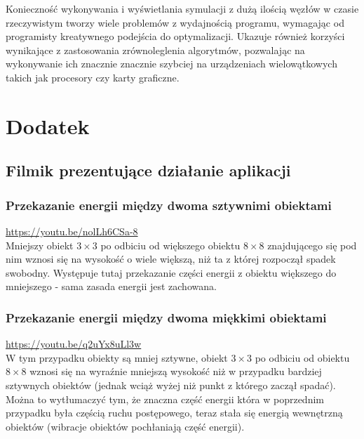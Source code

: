\documentclass[12pt, letterpaper]{report}
\begin{document}
    Konieczność wykonywania i wyświetlania symulacji z dużą ilością węzłów w czasie 
    rzeczywistym tworzy wiele problemów z wydajnością programu, wymagając
    od programisty kreatywnego podejścia do optymalizacji. Ukazuje również korzyści wynikające z 
    zastosowania zrównoleglenia algorytmów, pozwalając na wykonywanie ich znacznie znacznie szybciej na 
    urządzeniach wielowątkowych takich jak procesory czy karty graficzne.

    \section{Dodatek}
    \subsection{Filmik prezentujące działanie aplikacji}
    
    \subsubsection{Przekazanie energii między dwoma sztywnimi obiektami}
    \url{https://youtu.be/nolLh6CSa-8} \\

    Mniejszy obiekt $3 \times 3$ po odbiciu od większego obiektu $8 \times  8$ 
    znajdującego się  pod nim wznosi się na
    wysokość o wiele większą, niż ta z której rozpoczął spadek swobodny.
    Występuje tutaj przekazanie części energii z obiektu 
    większego do mniejszego - sama zasada energii jest zachowana.

    \subsubsection{Przekazanie energii między dwoma miękkimi obiektami}
    \url{https://youtu.be/q2uYx8uLl3w} \\

    W tym przypadku obiekty są mniej sztywne, obiekt $3 \times 3$ po odbiciu 
    od obiektu $8 \times  8$ wznosi się na wyraźnie mniejszą wysokość niż w przypadku bardziej sztywnych obiektów
    (jednak wciąż wyżej niż punkt z którego zaczął spadać). Można to wytłumaczyć tym,
    że znaczna część energii która w poprzednim przypadku była częścią ruchu postępowego,
    teraz stała się energią wewnętrzną obiektów (wibracje obiektów pochłaniają część energii).
\end{document}
